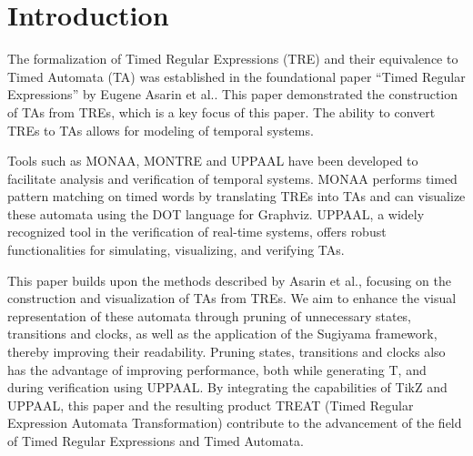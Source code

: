 \section{Introduction}
The formalization of Timed Regular Expressions (TRE) and their equivalence to Timed Automata (TA) was established in the foundational paper ``Timed Regular Expressions'' by Eugene Asarin et al.\cite{Eugene2001}.
This paper demonstrated the construction of TAs from TREs, which is a key focus of this paper.
The ability to convert TREs to TAs allows for modeling of temporal systems.

Tools such as MONAA, MONTRE and UPPAAL have been developed to facilitate analysis and verification of temporal systems.
MONAA performs timed pattern matching on timed words by translating TREs into TAs and can visualize these automata using the DOT language for Graphviz.
UPPAAL, a widely recognized tool in the verification of real-time systems, offers robust functionalities for simulating, visualizing, and verifying TAs.

This paper builds upon the methods described by Asarin et al., focusing on the construction and visualization of TAs from TREs.
We aim to enhance the visual representation of these automata through pruning of unnecessary states, transitions and clocks, as well as the application of the Sugiyama framework, thereby improving their readability.
Pruning states, transitions and clocks also has the advantage of improving performance, both while generating T, and during verification using UPPAAL.
By integrating the capabilities of TikZ and UPPAAL, this paper and the resulting product TREAT (Timed Regular Expression Automata Transformation) contribute to the advancement of the field of Timed Regular Expressions and Timed Automata.